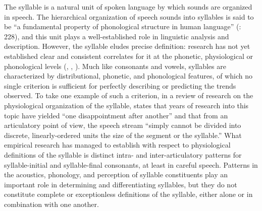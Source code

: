   The syllable is a natural unit of spoken language by which sounds are organized in speech. The hierarchical organization of speech sounds into syllables is said to be “a fundamental property of phonological structure in human language” (\citealt{GoldsteinEtAl2006}: 228), and this unit plays a well-established role in linguistic analysis and description. However, the syllable eludes precise definition: research has not yet established clear and consistent correlates for it at the phonetic, physiological or phonological levels (\citealt{BellHooper1978}, \citealt{Laver1994}, \citealt{Krakow1999}). Much like consonants and vowels, syllables are characterized by distributional, phonetic, and phonological features, of which no single criterion is sufficient for perfectly describing or predicting the trends observed. To take one example of such a criterion, in a review of research on the physiological organization of the syllable, \citet[23-34]{Krakow1999} states that years of research into this topic have yielded “one disappointment after another” and that from an articulatory point of view, the speech stream “simply cannot be divided into discrete, linearly-ordered units the size of the segment or the syllable.” What empirical research has managed to establish with respect to physiological definitions of the syllable is distinct intra- and inter-articulatory patterns for syllable-initial and syllable-final consonants, at least in careful speech. Patterns in the acoustics, phonology, and perception of syllable constituents play an important role in determining and differentiating syllables, but they do not constitute complete or exceptionless definitions of the syllable, either alone or in combination with one another.




